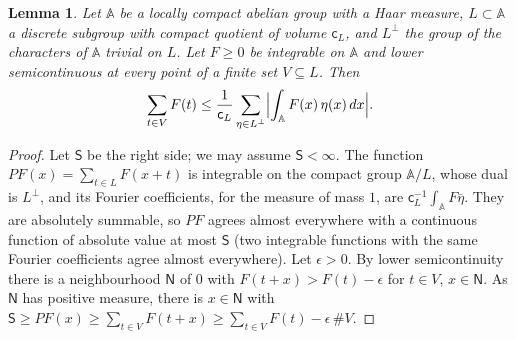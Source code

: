 \documentclass[10pt]{amsart}
\newtheorem{lemma}[theorem]{Lemma}
\theoremstyle{definition}
\theoremstyle{remark}
\providecommand{\aubar}[1]{\overline{#1}}
\begin{document}
\begin{lemma}\label{pbm:poisson}
Let $\mathbb A$ be a locally compact abelian group with a Haar measure, $L\subset\mathbb A$ a
discrete subgroup with compact quotient of volume $\mathsf c_L$, and $L^\perp$ the group of the
characters of $\mathbb A$ trivial on $L$. Let $F\ge0$ be integrable on $\mathbb A$ and lower
semicontinuous at every point of a finite set $V\subseteq L$. Then
\[
\sum_{t\in V}F(t)\le\frac1{\mathsf c_L}\sum_{\eta\in L^\perp}\Bigl|\int_{\mathbb A}F(x)\,\eta(x)\,dx\Bigr| .
\]
\end{lemma}
\begin{proof}
Let $\mathsf S$ be the right side; we may assume $\mathsf S<\infty$. The function $PF(x)=\sum_{t\in L}
F(x+t)$ is integrable on the compact group $\mathbb A/L$, whose dual is $L^\perp$, and its Fourier
coefficients, for the measure of mass $1$, are $\mathsf c_L^{-1}\int_{\mathbb A}F\aubar\eta$. They are
absolutely summable, so $PF$ agrees almost everywhere with a continuous function of absolute value
at most $\mathsf S$ (two integrable functions with the same Fourier coefficients agree almost
everywhere). Let $\epsilon>0$. By lower semicontinuity there is a neighbourhood $\mathsf N$ of $0$
with $F(t+x)>F(t)-\epsilon$ for $t\in V$, $x\in\mathsf N$. As $\mathsf N$ has positive measure,
there is $x\in\mathsf N$ with $\mathsf S\ge PF(x)\ge\sum_{t\in V}F(t+x)\ge\sum_{t\in V}F(t)-\epsilon\,
\#V$.
\end{proof}
\end{document}
